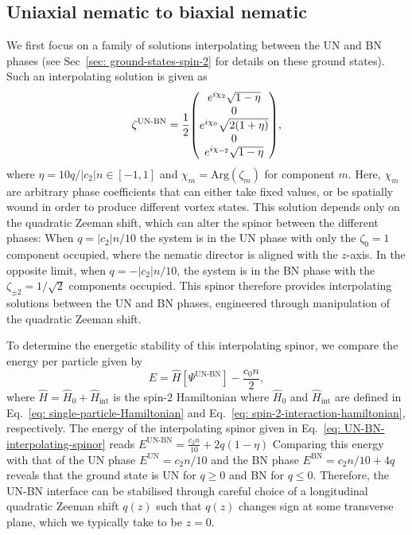 \subsection{Uniaxial nematic to biaxial nematic}\label{subsec: UN-BN-defects}
We first focus on a family of solutions interpolating between the UN and BN
phases (see Sec~\ref{sec: ground-states-spin-2} for details on these ground
states).
Such an interpolating solution is given as
\begin{align}\label{eq: UN-BN-interpolating-spinor}
    \zeta^\text{UN-BN} = \frac{1}{2}\mqty(
    e^{i\chi_2}\sqrt{1 - \eta} \\
    0 \\
    e^{i\chi_0}\sqrt{2(1+\eta)} \\
    0 \\
    e^{i\chi_{-2}}\sqrt{1 - \eta}
    ),
\end{align}
where \(\eta = 10q /|c_2|n \in [-1, 1]\) and \(\chi_m = \text{Arg}(\zeta_m)\)
for component \(m\).
Here, \(\chi_m\) are arbitrary phase coefficients that can either take fixed
values, or be spatially wound in order to produce different vortex states.
This solution depends only on the quadratic Zeeman shift, which can alter the
spinor between the different phases: When \(q = |c_2|n / 10\) the system is in
the UN phase with only the \(\zeta_0=1\) component occupied, where the nematic
director is aligned with the \(z\)-axis.
In the opposite limit, when \(q = -|c_2|n/10\), the system is in the
BN phase with the \(\zeta_{\pm 2} = 1/\sqrt{2}\) components occupied.
This spinor therefore provides interpolating solutions between the UN and BN
phases, engineered through manipulation of the quadratic Zeeman shift.

To determine the energetic stability of this interpolating spinor, we compare
the energy per particle given by~\cite{Kawaguchi2012}
\begin{equation}\label{eq: energy-per-particle}
    E = \hat{H}\left[\Psi^\text{UN-BN}\right] - \frac{c_0n}{2},
\end{equation}
where \(\hat{H} = \hat{H}_0 + \hat{H}_\text{int}\) is the spin-2
Hamiltonian where \(\hat{H}_0\) and \(\hat{H}_\text{int}\)
are defined in Eq.~\eqref{eq: single-particle-Hamiltonian} and
Eq.~\eqref{eq: spin-2-interaction-hamiltonian}, respectively.
The energy of the interpolating spinor given in
Eq.~\eqref{eq: UN-BN-interpolating-spinor} reads
\(E^\text{UN-BN} = \frac{c_2n}{10} + 2q(1 - \eta)\)
Comparing this energy with that of the UN phase
\(E^\text{UN} = c_2n/10\) and the BN phase
\(E^\text{BN} = c_2n/10 + 4q\) reveals that the ground state is UN for
\(q \geq 0\) and BN for \(q \leq 0\).
Therefore, the UN-BN interface can be stabilised through careful choice of
a longitudinal quadratic Zeeman shift \(q(z)\) such that \(q(z)\) changes
sign at some transverse plane, which we typically take to be \(z=0\).

